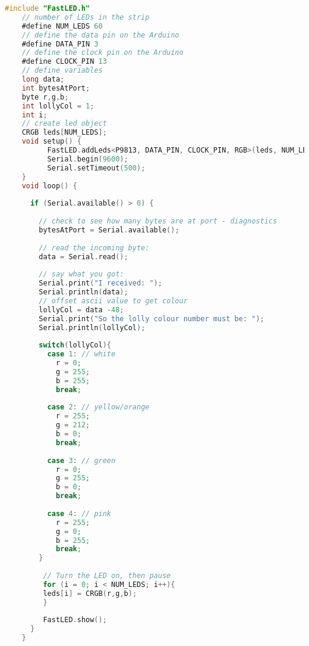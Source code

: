 

\begin{lstlisting}[language=C, caption = Lolly machine arduino code., label=list:arduinoCode1]
#include "FastLED.h"
    // number of LEDs in the strip
    #define NUM_LEDS 60
    // define the data pin on the Arduino
    #define DATA_PIN 3
    // define the clock pin on the Arduino
    #define CLOCK_PIN 13
    // define variables
    long data;
    int bytesAtPort;
    byte r,g,b;
    int lollyCol = 1;
    int i;
    // create led object
    CRGB leds[NUM_LEDS];
    void setup() { 
          FastLED.addLeds<P9813, DATA_PIN, CLOCK_PIN, RGB>(leds, NUM_LEDS);
          Serial.begin(9600);
          Serial.setTimeout(500);
    }
    void loop() { 
    
      if (Serial.available() > 0) {
    	  
    	// check to see how many bytes are at port - diagnostics  
        bytesAtPort = Serial.available();
        
        // read the incoming byte:
        data = Serial.read();
        
        // say what you got:
        Serial.print("I received: ");
        Serial.println(data);
        // offset ascii value to get colour
        lollyCol = data -48;
        Serial.print("So the lolly colour number must be: ");
        Serial.println(lollyCol);
    
        switch(lollyCol){
          case 1: // white
            r = 0;
            g = 255;
            b = 255;
            break;
        
          case 2: // yellow/orange
            r = 255;
            g = 212;
            b = 0;
            break;
        
          case 3: // green
            r = 0;
            g = 255;
            b = 0;
            break;
        
          case 4: // pink
            r = 255;
            g = 0;
            b = 255;
            break;
        }
        
         // Turn the LED on, then pause
         for (i = 0; i < NUM_LEDS; i++){
         leds[i] = CRGB(r,g,b);
         }
         
         FastLED.show();
      }
    }
\end{lstlisting}

